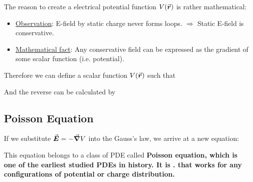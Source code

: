 \documentclass[class=article, crop=false, 12pt]{standalone}
\begin{document}
The reason to create a electrical potential function $V(\va*{r})$ is rather mathematical:
\begin{itemize}
    \item \ul{Observation}: 
    E-field by static charge never forms loops.
    $\Rightarrow$ Static E-field is conservative.

    \item \ul{Mathematical fact}: 
    Any conservative field can be expressed as the gradient of some scalar function (i.e. potential).
\end{itemize}

Therefore we can define a scalar function $V(\va*{r})$ such that 

And the reverse can be calculated by 

\subsection{Poisson Equation}

If we substitute $\va*{E} = -\grad V$ into the Gauss's law,
we arrive at a new equation: 

This equation belongs to a class of PDE called \bf{Poisson equation}, 
which is one of the earliest studied PDEs in history.
It is .
that works for any configurations of potential or charge distribution.
\end{document}
